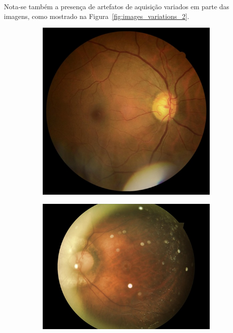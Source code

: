\documentclass[12pt]{article}
\begin{document}
Nota-se também a presença de artefatos de aquisição variados em parte das imagens, como mostrado na Figura~\ref{fig:images_variations_2}.

\begin{figure}
    \centering
    \begin{subfigure}[b]{0.2\textwidth}
        \centering
        \includegraphics[width=\textwidth]{images/examples_from_dataset/TRAIN025848.JPG}
        \label{fig:images_variations_2_1}
    \end{subfigure}
    \hfill
    \begin{subfigure}[b]{0.2\textwidth}
        \centering
        \includegraphics[width=\textwidth]{images/examples_from_dataset/TRAIN045963.JPG}

\end{subfigure}
\end{figure}
\end{document}
